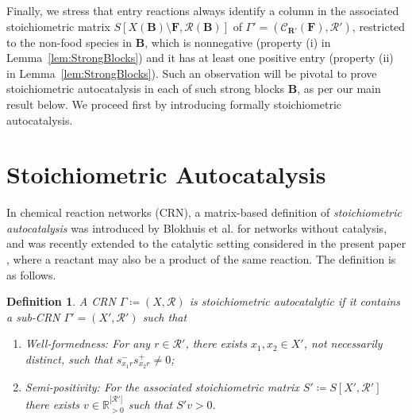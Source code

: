 \documentclass[pdflatex]{sn-jnl}
\theoremstyle{thmstyleone}%
\theoremstyle{examplesty}%
\theoremstyle{thmstylethree}%
\newtheorem{definition}[theorem]{Definition}%
\newcommand{\food}{\ensuremath{\mathbf{F}}}
\newcommand{\SM}{S}
\newcommand{\closure}[2]{\mathscr{C}_{#1}(#2)}
\newcommand{\CR}[0]{\mathcal{R}}
\newcommand{\RAF}[0]{\mathbf{R}'}
\newcommand{\block}[0]{\mathbf{B}}
\begin{document}
Finally, we stress that entry reactions always identify a column in the
associated stoichiometric matrix
$S[X(\block)\setminus \food, \mathcal{R}(\block)]$ of
$\Gamma'=(\closure{\RAF}{\food},\mathcal{R}')$, restricted to the non-food
species in $\block$, which is nonnegative (property (i) in
Lemma~\ref{lem:StrongBlocks}) and it has at least one positive entry
(property (ii) in Lemma~\ref{lem:StrongBlocks}). Such an observation will
be pivotal to prove stoichiometric autocatalysis in each of such strong
blocks $\block$, as per our main result below. We proceed first by
introducing formally stoichiometric autocatalysis.

\section{Stoichiometric Autocatalysis}\label{sec:AutoCatIrrRAF}

In chemical reaction networks (CRN), a matrix-based definition of
\emph{stoichiometric autocatalysis} was introduced by Blokhuis et
al. \cite{blokhuis_Universal_2020} for networks without catalysis, and was
recently extended to the catalytic setting considered in the present paper
\cite{golnik_autocatalytic_2026}, where a reactant may also be a product of
the same reaction. The definition is as follows.

\vspace{6pt}
\begin{definition}\label{def:autSubRN}
  A CRN $\Gamma\coloneqq (X,\CR)$ is \emph{stoichiometric autocatalytic} if
  it contains a sub-CRN $\Gamma'=(X',\CR')$ such that
  \begin{enumerate}
  \item[i.] \emph{Well-formedness:} For any $r\in \mathcal{R}'$, there
    exists $x_1, x_2 \in X'$, not necessarily distinct, such that
    $s^-_{x_1r}s^+_{x_2r}\neq 0$;
  \item[ii.] \emph{Semi-positivity:} For the associated stoichiometric
    matrix $\SM'\coloneqq \SM[X',\CR']$ there exists
    $v\in \mathbb{R}_{>0}^{|\CR'|}$ such that $\SM'v>0$.
  \end{enumerate}
\end{definition}
\vspace{6pt}
\end{document}
